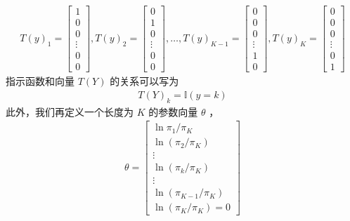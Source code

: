 \documentclass[letterpaper,10pt,english]{sphinxmanual}
\begin{document}
\begin{equation}\label{equation:无序离散模型/content:无序离散模型/content:7}
\begin{split}T(y)_1 = \begin{bmatrix} 1  \\ 0 \\0 \\ \vdots \\0 \\ 0 \end{bmatrix},
T(y)_2 = \begin{bmatrix} 0  \\ 1 \\0 \\ \vdots \\0 \\ 0 \end{bmatrix},
\dots,
T(y)_{K-1} = \begin{bmatrix} 0  \\ 0 \\0 \\ \vdots \\1 \\ 0 \end{bmatrix},
T(y)_{K} = \begin{bmatrix} 0  \\ 0 \\0 \\ \vdots \\0 \\ 1 \end{bmatrix}\end{split}
\end{equation}
指示函数和向量 \(T(Y)\) 的关系可以写为
\begin{equation}\label{equation:无序离散模型/content:无序离散模型/content:8}
\begin{split}T(Y)_k = \mathbb{I}(y=k)\end{split}
\end{equation}
此外，我们再定义一个长度为 \(K\) 的参数向量 \(\theta\)
，
\begin{equation}\label{equation:无序离散模型/content:无序离散模型/content:9}
\begin{split}\theta = \begin{bmatrix} \ln \pi_1/\pi_K  \\
\ln (\pi_2/\pi_K) \\
\vdots \\
\ln (\pi_k/\pi_K) \\
\vdots \\
\ln (\pi_{K-1}/\pi_K) \\
\ln (\pi_{K}/\pi_K)=0
\end{bmatrix}\end{split}
\end{equation}
\end{document}
